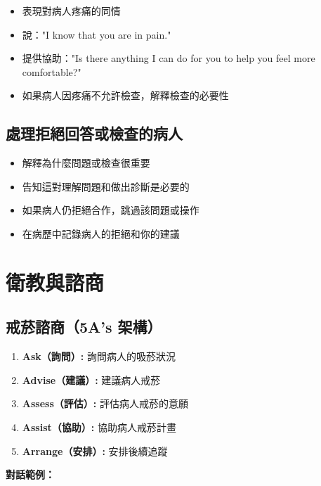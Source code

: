 \documentclass[12pt,a4paper]{article}
\begin{document}
\begin{itemize}
    \item 表現對病人疼痛的同情
    \item 說："I know that you are in pain."
    \item 提供協助："Is there anything I can do for you to help you feel more comfortable?"
    \item 如果病人因疼痛不允許檢查，解釋檢查的必要性
\end{itemize}

\subsection{處理拒絕回答或檢查的病人}

\begin{itemize}
    \item 解釋為什麼問題或檢查很重要
    \item 告知這對理解問題和做出診斷是必要的
    \item 如果病人仍拒絕合作，跳過該問題或操作
    \item 在病歷中記錄病人的拒絕和你的建議
\end{itemize}

\section{衛教與諮商}

\subsection{戒菸諮商（5A's 架構）}

\begin{enumerate}
    \item \textbf{Ask（詢問）:} 詢問病人的吸菸狀況
    \item \textbf{Advise（建議）:} 建議病人戒菸
    \item \textbf{Assess（評估）:} 評估病人戒菸的意願
    \item \textbf{Assist（協助）:} 協助病人戒菸計畫
    \item \textbf{Arrange（安排）:} 安排後續追蹤
\end{enumerate}

\textbf{對話範例：}
\end{document}

